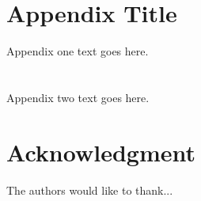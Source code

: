 \documentclass[journal]{IEEEtran}
\begin{document}
\appendices
\section{Appendix Title}
Appendix one text goes here.

\section{}
Appendix two text goes here.


\section*{Acknowledgment}


The authors would like to thank...


\ifCLASSOPTIONcaptionsoff
  \newpage
\fi








% 
\end{document}

